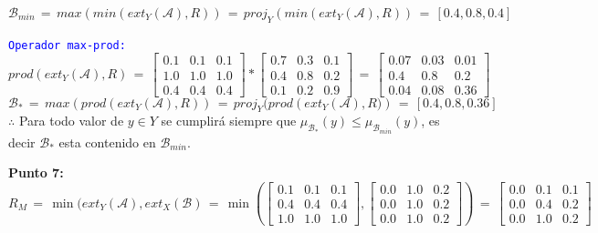 \documentclass[10pt,onecolumn,twoside,letterpaper]{article}
\begin{document}
\begin{equation*}
  \label{eq:relmax}
  \mathcal{B}_{min}\,=\,max(min(ext_Y(\mathcal{A}),R))\,=\,proj_Y\left(min(ext_Y(\mathcal{A}),R)\right)\,=\,\left[0.4,0.8,0.4\right]
\end{equation*}
\par \textcolor{blue}{\texttt{Operador max-prod:}} 
\begin{equation*}
  \label{eq:relation}
  prod(ext_Y(\mathcal{A}),R)\,=\,\left[
  \begin{array}{ccc}
    0.1&0.1&0.1\\
    1.0&1.0&1.0\\
    0.4&0.4&0.4
  \end{array}\right]*\left[
  \begin{array}{ccc}
    0.7&0.3&0.1\\
    0.4&0.8&0.2\\
    0.1&0.2&0.9
  \end{array}\right]\,=\,\left[
  \begin{array}{ccc}
    0.07&    0.03&    0.01\\
    0.4&   0.8&    0.2\\
    0.04&    0.08&    0.36
  \end{array}\right]
\end{equation*}
\begin{equation*}
  \label{eq:relmax}
  \mathcal{B}_*\,=\,max(prod(ext_Y(\mathcal{A}),R))\,=\,proj_Y(prod\left(ext_Y(\mathcal{A}),R)\right)\,=\,\left[0.4,0.8,0.36\right]
\end{equation*}
$\therefore$ Para todo valor de $y\in Y$ se cumplir\'a siempre que $\mu_{\mathcal{B}_*}(y)\leq \mu_{\mathcal{B}_{min}}(y)$, es decir $\mathcal{B}_*$ esta contenido en $\mathcal{B}_{min}$.
\par{\bf \large Punto 7:}\\
\begin{equation*}
  R_M \,=\,\min(ext_Y(\mathcal{A}),ext_X(\mathcal{B})\,=\,\min\left(\left[
  \begin{array}{ccc}
    0.1&0.1&0.1\\
    0.4&0.4&0.4\\
    1.0&1.0&1.0
  \end{array}\right],\left[
  \begin{array}{ccc}
    0.0&1.0&0.2\\
    0.0&1.0&0.2\\
    0.0&1.0&0.2
  \end{array}\right]\right)\,=\,
\left[
  \begin{array}{ccc}
    0.0&0.1&0.1\\
    0.0&0.4&0.2\\
    0.0&1.0&0.2
  \end{array}
\right]
\end{equation*}
\end{document}
